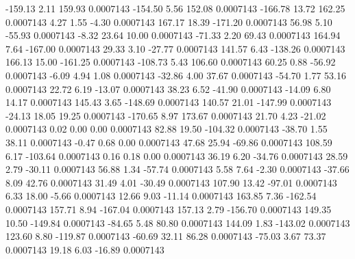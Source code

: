      -159.13        2.11      159.93     0.0007143
     -154.50        5.56      152.08     0.0007143
     -166.78       13.72      162.25     0.0007143
        4.27        1.55       -4.30     0.0007143
      167.17       18.39     -171.20     0.0007143
       56.98        5.10      -55.93     0.0007143
       -8.32       23.64       10.00     0.0007143
      -71.33        2.20       69.43     0.0007143
      164.94        7.64     -167.00     0.0007143
       29.33        3.10      -27.77     0.0007143
      141.57        6.43     -138.26     0.0007143
      166.13       15.00     -161.25     0.0007143
     -108.73        5.43      106.60     0.0007143
       60.25        0.88      -56.92     0.0007143
       -6.09        4.94        1.08     0.0007143
      -32.86        4.00       37.67     0.0007143
      -54.70        1.77       53.16     0.0007143
       22.72        6.19      -13.07     0.0007143
       38.23        6.52      -41.90     0.0007143
      -14.09        6.80       14.17     0.0007143
      145.43        3.65     -148.69     0.0007143
      140.57       21.01     -147.99     0.0007143
      -24.13       18.05       19.25     0.0007143
     -170.65        8.97      173.67     0.0007143
       21.70        4.23      -21.02     0.0007143
        0.02        0.00        0.00     0.0007143
       82.88       19.50     -104.32     0.0007143
      -38.70        1.55       38.11     0.0007143
       -0.47        0.68        0.00     0.0007143
       47.68       25.94      -69.86     0.0007143
      108.59        6.17     -103.64     0.0007143
        0.16        0.18        0.00     0.0007143
       36.19        6.20      -34.76     0.0007143
       28.59        2.79      -30.11     0.0007143
       56.88        1.34      -57.74     0.0007143
        5.58        7.64       -2.30     0.0007143
      -37.66        8.09       42.76     0.0007143
       31.49        4.01      -30.49     0.0007143
      107.90       13.42      -97.01     0.0007143
        6.33       18.00       -5.66     0.0007143
       12.66        9.03      -11.14     0.0007143
      163.85        7.36     -162.54     0.0007143
      157.71        8.94     -167.04     0.0007143
      157.13        2.79     -156.70     0.0007143
      149.35       10.50     -149.84     0.0007143
      -84.65        5.48       80.80     0.0007143
      144.09        1.83     -143.02     0.0007143
      123.60        8.80     -119.87     0.0007143
      -60.69       32.11       86.28     0.0007143
      -75.03        3.67       73.37     0.0007143
       19.18        6.03      -16.89     0.0007143
